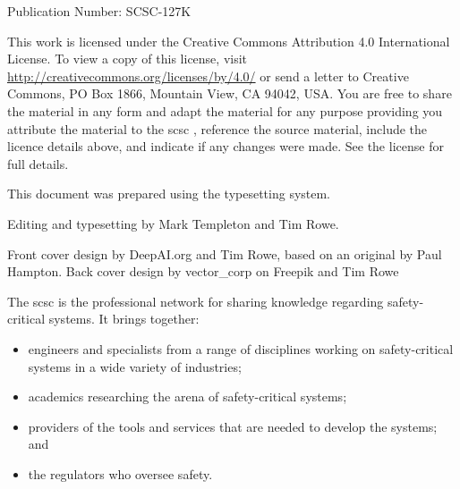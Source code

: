 %
%

%
%
\pagestyle{FirstPageFrontCover}
%
%



 Publication Number: SCSC-127K

This work is licensed under the Creative Commons Attribution 4.0 International License. To view a copy of this license, visit \href{http://creativecommons.org/licenses/by/4.0/}{http://creativecommons.org/licenses/by/4.0/} or send a letter to Creative Commons, PO Box 1866, Mountain View, CA 94042, USA\@. You are free to share the material in any form and adapt the material for any purpose providing you attribute the material to the \gls{scsc} , reference the source material, include the licence details above, and indicate if any changes were made.  See the license for full details.

This document was prepared using the \LaTeXe\/ typesetting system.

Editing and typesetting by Mark Templeton and Tim Rowe.

Front cover design by DeepAI.org and Tim Rowe, based on an original by Paul Hampton.
Back cover design by vector\_corp on Freepik and Tim Rowe


\clearpage
\pagestyle{ContinuationInsideFrontCover}
The \gls{scsc} is the professional network for sharing knowledge regarding safety-critical systems. It brings together: 
\begin{itemize}
	\item engineers and specialists from a range of disciplines working on safety-critical systems in a wide variety of industries;
	\item academics researching the arena of safety-critical systems;
	\item providers of the tools and services that are needed to develop the systems; and
	\item the regulators who oversee safety.
\end{itemize}

